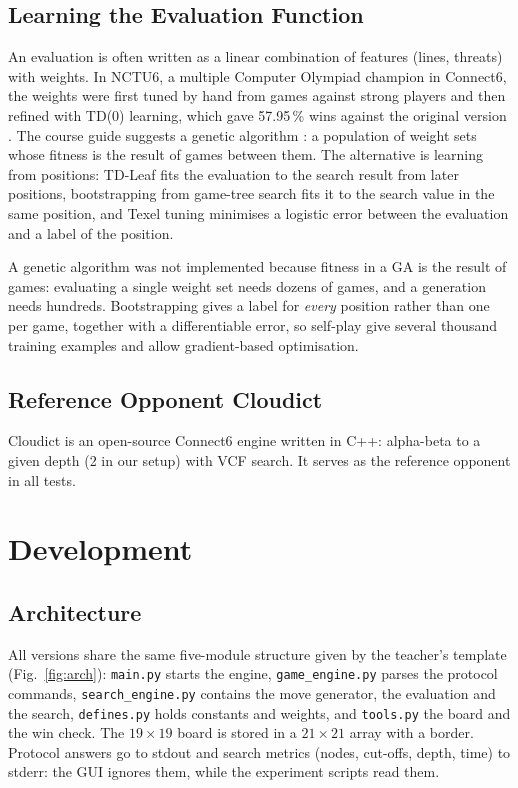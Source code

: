 \documentclass[a4paper,10pt,twocolumn]{article}
\newcommand{\code}[1]{\texttt{#1}}
\begin{document}
\subsection{Learning the Evaluation Function}
An evaluation is often written as a linear combination of features (lines, threats) with weights. In NCTU6, a multiple Computer Olympiad champion in Connect6, the weights were first tuned by hand from games against strong players and then refined with TD(0) learning, which gave 57.95\,\% wins against the original version \citep{wu2012td}. The course guide suggests a genetic algorithm \citep{statement}: a population of weight sets whose fitness is the result of games between them. The alternative is learning from positions: TD-Leaf \citep{baxter2000tdleaf} fits the evaluation to the search result from later positions, bootstrapping from game-tree search \citep{veness2009bootstrapping} fits it to the search value in the same position, and Texel tuning \citep{texel} minimises a logistic error between the evaluation and a label of the position.

A genetic algorithm was not implemented because fitness in a GA is the result of games: evaluating a single weight set needs dozens of games, and a generation needs hundreds. Bootstrapping gives a label for \emph{every} position rather than one per game, together with a differentiable error, so self-play give several thousand training examples and allow gradient-based optimisation.

\subsection{Reference Opponent Cloudict}
Cloudict \citep{cloudict} is an open-source Connect6 engine written in C++: alpha-beta to a given depth (2 in our setup) with VCF search. It serves as the reference opponent in all tests.

\section{Development}\label{sec:dev}

\subsection{Architecture}
All versions share the same five-module structure given by the teacher's template (Fig.~\ref{fig:arch}): \code{main.py} starts the engine, \code{game\_engine.py} parses the protocol commands, \code{search\_engine.py} contains the move generator, the evaluation and the search, \code{defines.py} holds constants and weights, and \code{tools.py} the board and the win check. The $19\times19$ board is stored in a $21\times21$ array with a border. Protocol answers go to stdout and search metrics (nodes, cut-offs, depth, time) to stderr: the GUI ignores them, while the experiment scripts read them.
\end{document}
